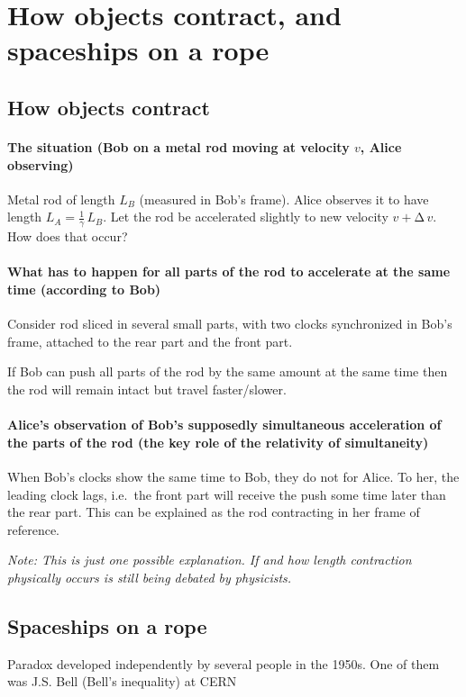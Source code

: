\documentclass[pagesize,headsepline,10pt,parskip=half]{scrreprt}
\newcommand*\mdelta[1]{\ensuremath{\mathrm{\Delta\,}#1}}
\begin{document}
    \section{How objects contract, and spaceships on a rope}
      \subsection{How objects contract}
        \paragraph{The situation (Bob on a metal rod moving at velocity $v$,
          Alice observing)}
          Metal rod of length $L_B$ (measured in Bob's frame).
          Alice observes it to have length $L_A = \frac{1}{\gamma} \, L_B$.
          Let the rod be accelerated slightly to new velocity $v + \mdelta{v}$.
          How does that occur?
        \paragraph{What has to happen for all parts of the rod to accelerate
          at the same time (according to Bob)}
          Consider rod sliced in several small parts, with two clocks
          synchronized in Bob's frame, attached to the rear part and
          the front part.

          If Bob can push all parts of the rod by the same amount at
          the same time then the rod will remain intact but travel
          faster/slower.
        \paragraph{Alice’s observation of Bob’s supposedly simultaneous
          acceleration of the parts of the rod (the key role of
          the relativity of simultaneity)}
          When Bob's clocks show the same time to Bob, they do not for Alice.
          To her, the leading clock lags, i.e.\ the front part will receive
          the push some time later than the rear part.  This can be explained
          as the rod contracting in her frame of reference.

        \emph{Note: This is just one possible explanation.  If and how
          length contraction physically occurs is still being debated
          by physicists.}

      \subsection{Spaceships on a rope}
        Paradox developed independently by several people in the 1950s.
        One of them was J.S. Bell (Bell’s inequality) at CERN
\end{document}

